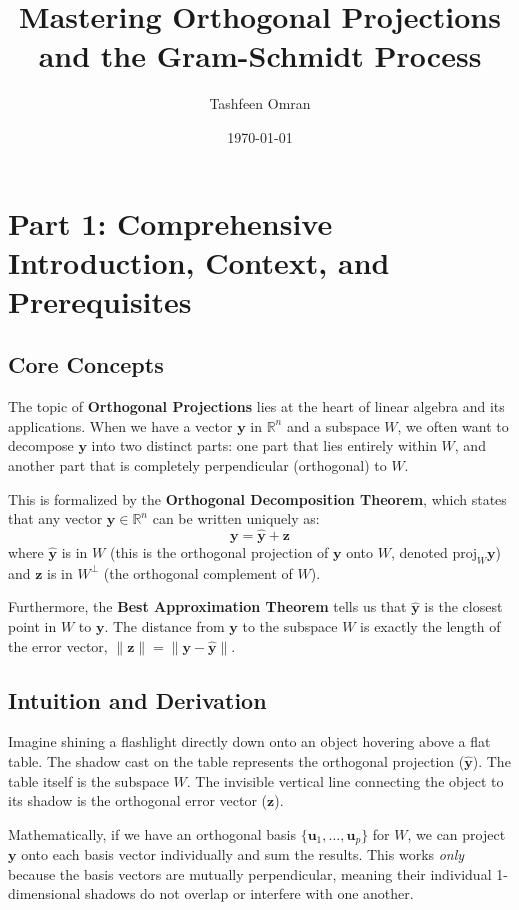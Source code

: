 \documentclass[11pt, letterpaper]{article}
\title{Mastering Orthogonal Projections and the Gram-Schmidt Process}
\author{Tashfeen Omran}
\date{\today}
\theoremstyle{definition}
\theoremstyle{remark}
\newcommand{\R}{\mathbb{R}}
\begin{document}
\maketitle
\tableofcontents
\newpage

\section{Part 1: Comprehensive Introduction, Context, and Prerequisites}

\subsection{Core Concepts}
The topic of \textbf{Orthogonal Projections} lies at the heart of linear algebra and its applications. When we have a vector $\mathbf{y}$ in $\R^n$ and a subspace $W$, we often want to decompose $\mathbf{y}$ into two distinct parts: one part that lies entirely within $W$, and another part that is completely perpendicular (orthogonal) to $W$. 

This is formalized by the \textbf{Orthogonal Decomposition Theorem}, which states that any vector $\mathbf{y} \in \R^n$ can be written uniquely as:
\[ \mathbf{y} = \hat{\mathbf{y}} + \mathbf{z} \]
where $\hat{\mathbf{y}}$ is in $W$ (this is the orthogonal projection of $\mathbf{y}$ onto $W$, denoted $\text{proj}_W \mathbf{y}$) and $\mathbf{z}$ is in $W^\perp$ (the orthogonal complement of $W$). 

Furthermore, the \textbf{Best Approximation Theorem} tells us that $\hat{\mathbf{y}}$ is the closest point in $W$ to $\mathbf{y}$. The distance from $\mathbf{y}$ to the subspace $W$ is exactly the length of the error vector, $\|\mathbf{z}\| = \|\mathbf{y} - \hat{\mathbf{y}}\|$.

\subsection{Intuition and Derivation}
Imagine shining a flashlight directly down onto an object hovering above a flat table. The shadow cast on the table represents the orthogonal projection ($\hat{\mathbf{y}}$). The table itself is the subspace $W$. The invisible vertical line connecting the object to its shadow is the orthogonal error vector ($\mathbf{z}$). 

Mathematically, if we have an orthogonal basis $\{\mathbf{u}_1, \dots, \mathbf{u}_p\}$ for $W$, we can project $\mathbf{y}$ onto each basis vector individually and sum the results. This works \textit{only} because the basis vectors are mutually perpendicular, meaning their individual 1-dimensional shadows do not overlap or interfere with one another.
\end{document}
